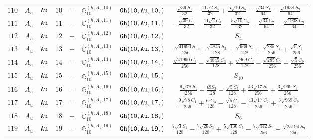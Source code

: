 \documentclass[fleqn,8pt]{jsarticle}
\begin{document}
\begin{table}[ht!]
\begin{center}
\begin{tabular}{cccccccc}
$ 110 $ & $ A_{u} $ & $ {\tt Au} $ & $ 10 $ & $ - $ & $ \mathbb{G}_{10}^{(h,A_{u},10)} $ & $ {\tt Gh(10,Au,10,)} $ & $ \frac{\sqrt{39} S_{1}}{32} - \frac{11 \sqrt{2} S_{3}}{32} + \frac{5 \sqrt{10} S_{5}}{32} - \frac{\sqrt{34} S_{7}}{64} - \frac{\sqrt{1938} S_{9}}{64} $ \\
$ 111 $ & $ A_{u} $ & $ {\tt Au} $ & $ 11 $ & $ - $ & $ \mathbb{G}_{10}^{(h,A_{u},11)} $ & $ {\tt Gh(10,Au,11,)} $ & $ - \frac{\sqrt{39} C_{1}}{32} - \frac{11 \sqrt{2} C_{3}}{32} - \frac{5 \sqrt{10} C_{5}}{32} - \frac{\sqrt{34} C_{7}}{64} + \frac{\sqrt{1938} C_{9}}{64} $ \\
$ 112 $ & $ A_{u} $ & $ {\tt Au} $ & $ 12 $ & $ - $ & $ \mathbb{G}_{10}^{(h,A_{u},12)} $ & $ {\tt Gh(10,Au,12,)} $ & $ S_{4} $ \\
$ 113 $ & $ A_{u} $ & $ {\tt Au} $ & $ 13 $ & $ - $ & $ \mathbb{G}_{10}^{(h,A_{u},13)} $ & $ {\tt Gh(10,Au,13,)} $ & $ \frac{\sqrt{41990} S_{1}}{256} + \frac{\sqrt{4845} S_{3}}{128} + \frac{\sqrt{969} S_{5}}{128} + \frac{\sqrt{285} S_{7}}{256} + \frac{\sqrt{5} S_{9}}{256} $ \\
$ 114 $ & $ A_{u} $ & $ {\tt Au} $ & $ 14 $ & $ - $ & $ \mathbb{G}_{10}^{(h,A_{u},14)} $ & $ {\tt Gh(10,Au,14,)} $ & $ \frac{\sqrt{41990} C_{1}}{256} - \frac{\sqrt{4845} C_{3}}{128} + \frac{\sqrt{969} C_{5}}{128} - \frac{\sqrt{285} C_{7}}{256} + \frac{\sqrt{5} C_{9}}{256} $ \\
$ 115 $ & $ A_{u} $ & $ {\tt Au} $ & $ 15 $ & $ - $ & $ \mathbb{G}_{10}^{(h,A_{u},15)} $ & $ {\tt Gh(10,Au,15,)} $ & $ S_{10} $ \\
$ 116 $ & $ A_{u} $ & $ {\tt Au} $ & $ 16 $ & $ - $ & $ \mathbb{G}_{10}^{(h,A_{u},16)} $ & $ {\tt Gh(10,Au,16,)} $ & $ \frac{9 \sqrt{78} S_{1}}{256} - \frac{69 S_{3}}{128} - \frac{\sqrt{5} S_{5}}{128} + \frac{43 \sqrt{17} S_{7}}{256} + \frac{3 \sqrt{969} S_{9}}{256} $ \\
$ 117 $ & $ A_{u} $ & $ {\tt Au} $ & $ 17 $ & $ - $ & $ \mathbb{G}_{10}^{(h,A_{u},17)} $ & $ {\tt Gh(10,Au,17,)} $ & $ \frac{9 \sqrt{78} C_{1}}{256} + \frac{69 C_{3}}{128} - \frac{\sqrt{5} C_{5}}{128} - \frac{43 \sqrt{17} C_{7}}{256} + \frac{3 \sqrt{969} C_{9}}{256} $ \\
$ 118 $ & $ A_{u} $ & $ {\tt Au} $ & $ 18 $ & $ - $ & $ \mathbb{G}_{10}^{(h,A_{u},18)} $ & $ {\tt Gh(10,Au,18,)} $ & $ S_{6} $ \\
$ 119 $ & $ A_{u} $ & $ {\tt Au} $ & $ 19 $ & $ - $ & $ \mathbb{G}_{10}^{(h,A_{u},19)} $ & $ {\tt Gh(10,Au,19,)} $ & $ \frac{7 \sqrt{3} S_{1}}{128} - \frac{7 \sqrt{26} S_{3}}{128} + \frac{5 \sqrt{130} S_{5}}{128} - \frac{7 \sqrt{442} S_{7}}{256} + \frac{\sqrt{25194} S_{9}}{256} $ \\

\end{tabular}
\end{center}
\end{table}
\end{document}
